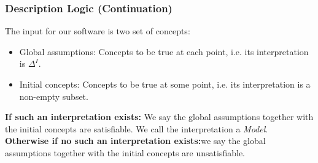 \begin{frame}
\frametitle{Description Logic (Continuation)}
The input for our software is two set of concepts: \pause
\begin{itemize}
\item Global assumptions: Concepts to be true at each point, i.e. its interpretation is $\Delta^{I}$.
\item Initial concepts: Concepts to be true at some point, i.e. its interpretation is a non-empty subset.
\end{itemize}
\bigskip
{\bf If such an interpretation exists:} We say the global assumptions together with the initial concepts are
satisfiable. We call the interpretation a {\it Model}. \\
\smallskip
\pause
{\bf Otherwise if no such an interpretation exists:}we say the global assumptions together with the initial concepts are unsatisfiable.
\end{frame}

